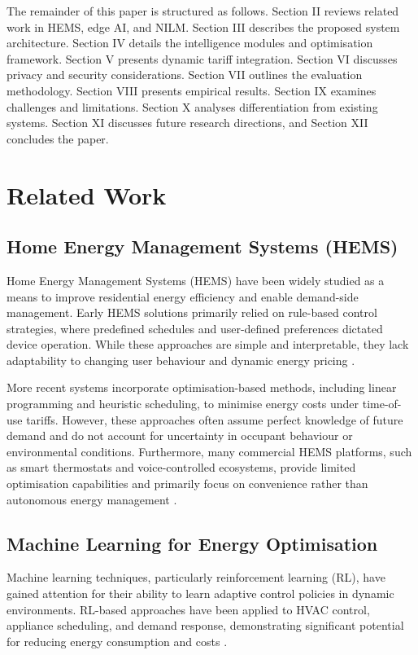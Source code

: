 \documentclass[11pt,a4paper]{article}
\begin{document}
The remainder of this paper is structured as follows. Section II reviews related work in HEMS, edge AI, and NILM. Section III describes the proposed system architecture. Section IV details the intelligence modules and optimisation framework. Section V presents dynamic tariff integration. Section VI discusses privacy and security considerations. Section VII outlines the evaluation methodology. Section VIII presents empirical results. Section IX examines challenges and limitations. Section X analyses differentiation from existing systems. Section XI discusses future research directions, and Section XII concludes the paper.

\section{Related Work}
\subsection{Home Energy Management Systems (HEMS)}

Home Energy Management Systems (HEMS) have been widely studied as a means to improve residential energy efficiency and enable demand-side management. Early HEMS solutions primarily relied on rule-based control strategies, where predefined schedules and user-defined preferences dictated device operation. While these approaches are simple and interpretable, they lack adaptability to changing user behaviour and dynamic energy pricing \cite{beaudin2015home}.

More recent systems incorporate optimisation-based methods, including linear programming and heuristic scheduling, to minimise energy costs under time-of-use tariffs. However, these approaches often assume perfect knowledge of future demand and do not account for uncertainty in occupant behaviour or environmental conditions. Furthermore, many commercial HEMS platforms, such as smart thermostats and voice-controlled ecosystems, provide limited optimisation capabilities and primarily focus on convenience rather than autonomous energy management \cite{zipperer2013electric}.

\subsection{Machine Learning for Energy Optimisation}

Machine learning techniques, particularly reinforcement learning (RL), have gained attention for their ability to learn adaptive control policies in dynamic environments. RL-based approaches have been applied to HVAC control, appliance scheduling, and demand response, demonstrating significant potential for reducing energy consumption and costs \cite{vazquez2019reinforcement}.
\end{document}
